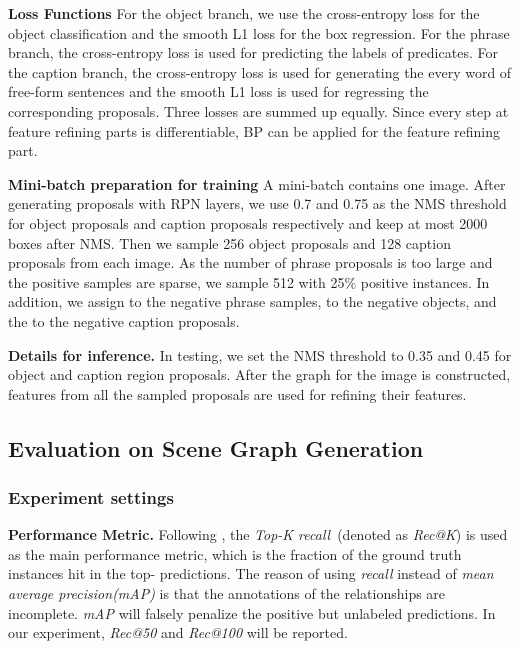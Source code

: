 \textbf{Loss Functions}
For the object branch, we use the cross-entropy loss for the object classification and the smooth L1 loss for the box regression. For the phrase branch, the cross-entropy loss is used for predicting the labels of predicates. For the caption branch, the cross-entropy loss is used for generating the every word of free-form sentences and the smooth L1 loss is used for regressing the corresponding proposals. Three losses are summed up equally. Since every step at feature refining parts is differentiable, BP can be applied for the feature refining part.

\textbf{Mini-batch preparation for training} 
A mini-batch contains one image. After generating proposals with RPN layers, we use 0.7 and 0.75 as the NMS threshold for object proposals and caption proposals respectively and keep at most 2000 boxes after NMS. Then we sample 256 object proposals and 128 caption proposals from each image. As the number of phrase proposals is too large and the positive samples are sparse, we sample 512 with 25\% positive instances. In addition, we assign  to the negative phrase samples,  to the negative objects, and the  to the negative caption proposals.

\textbf{Details for inference.} In testing, we set the NMS threshold to 0.35 and 0.45 for object and caption region proposals. After the graph for the image is constructed,  features from all the sampled proposals are used for refining their features.

\subsection{Evaluation on Scene Graph Generation}
\subsubsection{Experiment settings}
\label{sec:exp_setting}

\textbf{Performance Metric.} Following \cite{visual_relationship}, the \emph{Top-K recall}~(denoted as \emph{Rec@K}) is used as the main performance metric, which is the fraction of the ground truth instances hit in the top- predictions. The reason of using \emph{recall} instead of \emph{mean average precision(mAP)} is that the annotations of the relationships are incomplete. \emph{mAP} will falsely penalize the positive but unlabeled predictions. In our experiment,  \emph{Rec@50} and \emph{Rec@100} will be reported. 

